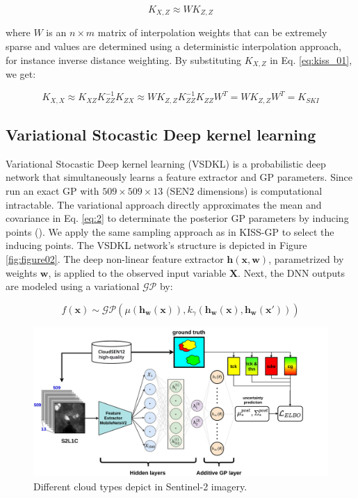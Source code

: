 \documentclass[a4paper, nobind]{templates/cdethesis}
\begin{document}
\begin{equation}
K_{X, Z} \approx WK_{Z, Z}
\label{eq:kiss_02}
\end{equation}

where \(W\) is an \(n \times m\) matrix of interpolation weights that
can be extremely sparse and values are determined using a deterministic interpolation approach, for instance inverse distance weighting. By substituting \(K_{X,Z}\) in Eq. \ref{eq:kiss_01}, we get:

\begin{equation}
K_{X, X} \approx K_{XZ}K_{ZZ}^{-1}K_{ZX} \approx WK_{Z,Z}K_{ZZ}^{-1}K_{ZZ}W^{T} = WK_{Z,Z}W^{T} = K_{SKI}
\label{eq:kiss_03}
\end{equation}

\subsection{Variational Stocastic Deep kernel learning}
\label{section:vsdkl}

Variational Stocastic Deep kernel learning (VSDKL) is a probabilistic deep network that simultaneously learns a feature extractor and GP parameters. Since run an exact GP with \(509 \times 509 \times 13\) (SEN2 dimensions) is computational intractable. The variational approach directly approximates the mean and covariance in Eq. \ref{eq:2} to determinate the posterior GP parameters by inducing points (\cite{titsias2009variational}). We apply the same sampling approach as in KISS-GP to select the inducing points. The VSDKL network's structure is depicted in Figure \ref{fig:figure02}. The deep non-linear feature extractor \(\mathbf{h(x,w)}\), parametrized by weights \(\mathbf{w}\), is applied to the observed input variable \(\mathbf{X}\). Next, the DNN outputs are modeled using a variational \(\mathcal{GP}\) by:

\begin{equation}
f(\mathbf{x}) \sim \mathcal{GP}(
    \mu(\mathbf{h_w(x)}),
    k_{\gamma}(\mathbf{h_w(x)}, \mathbf{h_w({x}')})
)
\end{equation}

\begin{figure}[!h]
    \centering
    \includegraphics[width=1.1\linewidth]{figures/chapter02/figure03.pdf}
    \caption{Different cloud types depict in Sentinel-2 imagery.}
    \label{fig:figure013}
\end{figure}
\end{document}
